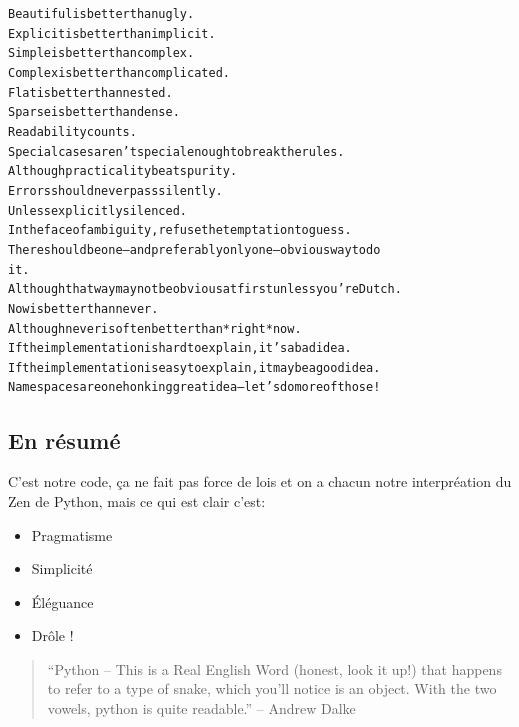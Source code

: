 \documentclass[letterpaper,10pt,english]{/Users/mlhamel/venv/apius/lib/python2.7/site-packages/sphinx/texinputs/sphinxhowto}
\newenvironment{InvisibleVerbatim}
        {\begin{mdframed}[leftmargin=0.1\linewidth,innerleftmargin=3pt,innerrightmargin=3pt, userdefinedwidth=1\linewidth, linewidth=0pt, linecolor=white, usetwoside=false]}
        {\end{mdframed}}
\begin{document}
                \begin{InvisibleVerbatim}
                \vspace{-0.5\baselineskip}
\begin{alltt}
    Beautiful is better than ugly.
    Explicit is better than implicit.
    Simple is better than complex.
    Complex is better than complicated.
    Flat is better than nested.
    Sparse is better than dense.
    Readability counts.
    Special cases aren't special enough to break the rules.
    Although practicality beats purity.
    Errors should never pass silently.
    Unless explicitly silenced.
    In the face of ambiguity, refuse the temptation to guess.
    There should be one-- and preferably only one --obvious way to do
it.
    Although that way may not be obvious at first unless you're Dutch.
    Now is better than never.
    Although never is often better than *right* now.
    If the implementation is hard to explain, it's a bad idea.
    If the implementation is easy to explain, it may be a good idea.
    Namespaces are one honking great idea -- let's do more of those!



\end{alltt}

            \end{InvisibleVerbatim}
            
        
    
\subsection{En résumé}\label{en-résumé}

C'est notre code, ça ne fait pas force de lois et on a chacun notre
interpréation du Zen de Python, mais ce qui est clair c'est:

\begin{itemize}
\itemsep1pt\parskip0pt
\item
  Pragmatisme
\item
  Simplicité
\item
  Éléguance
\item
  Drôle !
\end{itemize}

\begin{quote}
``Python -- This is a Real English Word (honest, look it up!) that
happens to refer to a type of snake, which you'll notice is an object.
With the two vowels, python is quite readable.'' -- Andrew Dalke
\end{quote}
\end{document}

